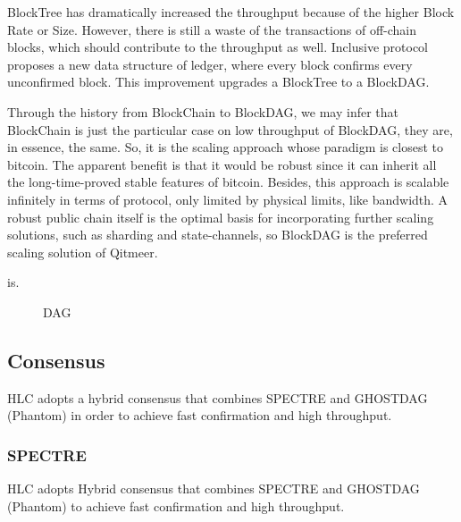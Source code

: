 \documentclass[a4paper,11pt]{article}
\begin{document}
BlockTree has dramatically increased the throughput because of the higher Block Rate or Size. However, there is still a waste of the transactions of off-chain blocks, which should contribute to the throughput as well. Inclusive protocol proposes a new data structure of ledger, where every block confirms every unconfirmed block. This improvement upgrades a BlockTree to a BlockDAG. 

Through the history from BlockChain to BlockDAG, we may infer that BlockChain is just the particular case on low throughput of BlockDAG, they are, in essence, the same. So, it is the scaling approach whose paradigm is closest to bitcoin. The apparent benefit is that it would be robust since it can inherit all the long-time-proved stable features of bitcoin. Besides, this approach is scalable infinitely in terms of protocol, only limited by physical limits, like bandwidth. A robust public chain itself is the optimal basis for incorporating further scaling solutions, such as sharding and state-channels, so BlockDAG is the preferred scaling solution of Qitmeer.

is\cite{Yonatan-high-rate-bitcoin}\cite{bitcoin-backbone}\cite{asynchronous}.

\begin{figure}[hbt]
	\centerline{%
	}
\caption{DAG}
\end{figure}

\subsection{Consensus}
HLC adopts a hybrid consensus that combines SPECTRE and GHOSTDAG (Phantom) in order to achieve fast confirmation and high throughput.

\subsubsection{SPECTRE}
HLC adopts Hybrid consensus that combines SPECTRE and GHOSTDAG (Phantom) to achieve fast confirmation and high throughput.
\end{document}
